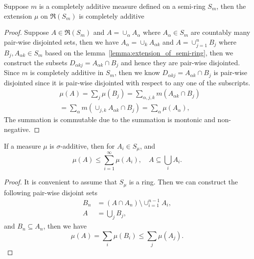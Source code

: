 \begin{theorem}
Suppose $m$ is a completely additive measure defined on a semi-ring $S_m$, then the extension $\mu$ on $\mathfrak{R}(S_m)$ is completely additive 
\end{theorem}
\begin{proof}
Suppose $A\in\mathfrak{R}(S_m)$ and $A=\cup_\alpha A_\alpha$ where $A_\alpha\in S_m$ are countably many pair-wise disjointed sets, then we have $A_\alpha=\cup_kA_{\alpha k}$ and $A=\cup_{j=1}^nB_j$ where $B_j, A_{\alpha k}\in S_m$ based on the lemma~\ref{lemma:extension_of_semi-ring}, then we construct the subsets $D_{\alpha kj}=A_{\alpha k}\cap B_{j}$ and hence they are pair-wise disjointed. Since $m$ is completely additive in $S_m$, then we know $D_{\alpha kj}=A_{\alpha k}\cap B_j$ is pair-wise disjointed since it is pair-wise disjointed with respect to any one of the subscripts. 
\begin{equation}
\begin{aligned}
&\mu(A)=\sum_j\mu(B_j)=\sum_{\alpha,j,k} m(A_{\alpha k}\cap B_j)\\
&=\sum_{\alpha}m(\cup_{j,k} A_{\alpha k}\cap B_j)=\sum_\alpha \mu(A_\alpha), 
\end{aligned}
\end{equation}
The summation is commutable due to the summation is montonic and non-negative.
\end{proof}

\begin{theorem}\label{theorem:measure_compare}
If a measure $\mu$ is $\sigma$-additive, then for $A_i\in S_\mu$, and 
\begin{equation}
\mu(A)\le \sum_{i=1}^\infty\mu(A_i),\quad A\subseteq \bigcup_iA_i.
\end{equation}
\end{theorem}
\begin{proof}
It is convenient to assume that $S_\mu$ is a ring. Then we can construct the following pair-wise disjoint sets
\begin{equation}
\begin{aligned}
B_n&=(A\cap A_n)\setminus \cup_{i=1}^{n-1}A_i,\\
A&=\bigcup_jB_j,
\end{aligned}
\end{equation}
and $B_n\subseteq A_n$, then we have
\begin{equation}
\mu(A)=\sum_i\mu(B_i)\le\sum_j\mu(A_j).
\end{equation}
\end{proof}


